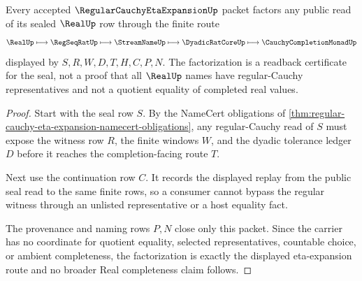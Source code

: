 \begin{theorem}
\label{thm:regular-cauchy-eta-expansion-real-seal-factorization}
Every accepted $\RegularCauchyEtaExpansionUp$ packet factors any public read of its sealed $\RealUp$ row through the finite route
$$
\RealUp \longmapsto \RegSeqRatUp \longmapsto \StreamNameUp \longmapsto \DyadicRatCoreUp \longmapsto \CauchyCompletionMonadUp
$$
displayed by $S,R,W,D,T,H,C,P,N$. The factorization is a readback certificate for the seal, not a proof that all $\RealUp$ names have regular-Cauchy representatives and not a quotient equality of completed real values.
\end{theorem}
\begin{proof}
Start with the seal row $S$. By the NameCert obligations of \autoref{thm:regular-cauchy-eta-expansion-namecert-obligations}, any regular-Cauchy read of $S$ must expose the witness row $R$, the finite windows $W$, and the dyadic tolerance ledger $D$ before it reaches the completion-facing route $T$.

Next use the continuation row $C$. It records the displayed replay from the public seal read to the same finite rows, so a consumer cannot bypass the regular witness through an unlisted representative or a host equality fact.

The provenance and naming rows $P,N$ close only this packet. Since the carrier has no coordinate for quotient equality, selected representatives, countable choice, or ambient completeness, the factorization is exactly the displayed eta-expansion route and no broader Real completeness claim follows.
\end{proof}


\begin{closurestatus}{\RegularCauchyEtaExpansionUp}
  \theoryclosure{\seedClosure}
  \formalstatus{\unformalizedV}
\end{closurestatus}
